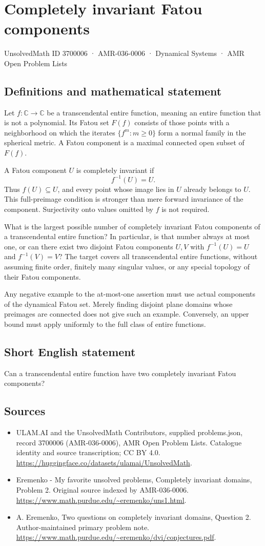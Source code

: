\documentclass[11pt,a4paper]{article}
\begin{document}
\section*{Completely invariant Fatou components}\label{3700006}
{\small UnsolvedMath ID 3700006 · AMR-036-0006 · Dynamical Systems · AMR Open Problem Lists}
\subsection{Definitions and mathematical statement}
Let $f:\mathbb C\to\mathbb C$ be a transcendental entire
function, meaning an entire function that is not a polynomial.
Its Fatou set $F(f)$ consists of those points with a neighborhood
on which the iterates $\{f^m:m\geq0\}$ form a normal family
in the spherical metric. A Fatou component is a maximal
connected open subset of $F(f)$.

A Fatou component $U$ is completely invariant if
\[
                      f^{-1}(U)=U.
\]
Thus $f(U)\subseteq U$, and every point whose image lies in
$U$ already belongs to $U$. This full-preimage condition is
stronger than mere forward invariance of the component.
Surjectivity onto values omitted by $f$ is not required.

What is the largest possible number of completely invariant
Fatou components of a transcendental entire function? In
particular, is that number always at most one, or can there
exist two disjoint Fatou components $U,V$ with
$f^{-1}(U)=U$ and $f^{-1}(V)=V$?
The target covers all transcendental entire functions,
without assuming finite order, finitely many singular values,
or any special topology of their Fatou components.

Any negative example to the at-most-one assertion must use
actual components of the dynamical Fatou set. Merely finding
disjoint plane domains whose preimages are connected does
not give such an example. Conversely, an upper bound must
apply uniformly to the full class of entire functions.
\subsection{Short English statement}
Can a transcendental entire function have two completely invariant Fatou components?
\subsection{Sources}
\begin{itemize}
\item[S1] ULAM.AI and the UnsolvedMath Contributors, supplied problems.json, record 3700006 (AMR-036-0006), AMR Open Problem Lists. Catalogue identity and source transcription; CC BY 4.0.
\url{https://huggingface.co/datasets/ulamai/UnsolvedMath}.
\item[S2] Eremenko - My favorite unsolved problems, Completely invariant domains, Problem 2. Original source indexed by AMR-036-0006.
\url{https://www.math.purdue.edu/~eremenko/uns1.html}.
\item[S3] A. Eremenko, Two questions on completely invariant domains, Question 2. Author-maintained primary problem note.
\url{https://www.math.purdue.edu/~eremenko/dvi/conjectures.pdf}.
\end{itemize}
\end{document}
